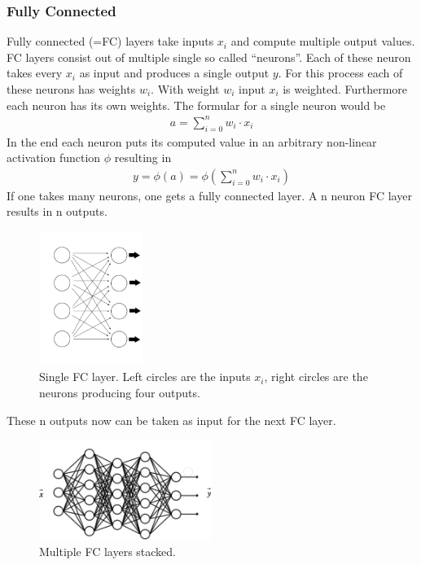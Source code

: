 \documentclass[
     11pt,         %
     a4paper,      %
     oneside,
     ]{article}
\begin{document}
\subsubsection{Fully Connected}
Fully connected (=FC) layers take inputs $x_i$ and compute multiple output values. FC layers consist out of multiple single so called \enquote{neurons}. Each of these neuron takes every $x_i$ as input and produces a single output $y$. For this process each of these neurons has weights $w_i$. With weight $w_i$ input $x_i$ is weighted. Furthermore each neuron has its own weights.
The formular for a single neuron would be
\begin{align*}
  a = \sum^n_{i=0} w_i \cdot x_i
\end{align*}
In the end each neuron puts its computed value in an arbitrary non-linear activation function $\phi$ resulting in
\begin{align*}
  y = \phi (a) = \phi ( \sum^n_{i=0} w_i \cdot x_i )
\end{align*}
If one takes many neurons, one gets a fully connected layer. A n neuron FC layer results in n outputs.
\begin{figure}[H]
  \begin{center}
    \includegraphics[width=0.3\textwidth]{images/fc-layer.png}
    \caption{Single FC layer. Left circles are the inputs $x_i$, right circles are the neurons producing four outputs.}
    \label{fig:fc-layer}
  \end{center}
\end{figure}

These n outputs now can be taken as input for the next FC layer.
\begin{figure}[H]
  \begin{center}
    \includegraphics[width=0.5\textwidth]{images/multipleFC.png}
    \caption{Multiple FC layers stacked.}
    \label{fig:multipleFC}
  \end{center}
\end{figure}
\end{document}
